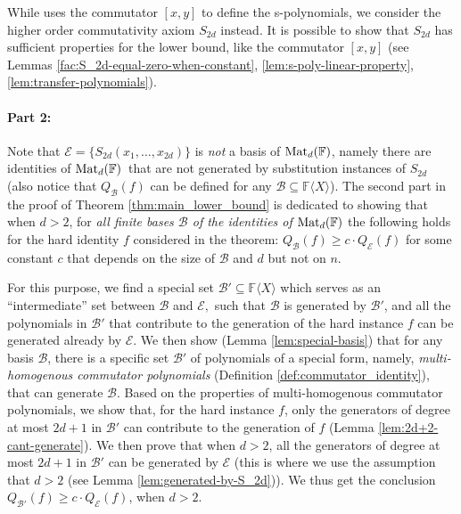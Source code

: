 \documentclass[12pt,reqno]{article}
\newcommand\F{\ensuremath{\mathbb F}}
\newcommand {\para}[1] {\paragraph{#1}}
\newcommand{\matd}{{\ensuremath{{\rm Mat}_d(\F)}}}
\newcommand{\freea}{\ensuremath{\F\langle X\rangle}}
\begin{document}
While \cite{Hru11} uses the commutator $[x,y]$ to define the s-polynomials, we consider the higher order commutativity axiom $S_{2d}$ instead. It is possible to show that  $S_{2d}$ has sufficient properties for the lower bound, like the commutator $[x,y]$ (see Lemmas \ref{fac:S_2d-equal-zero-when-constant}, \ref{lem:s-poly-linear-property}, \ref{lem:transfer-polynomials}).

\para{Part 2:} Note that $\mathcal E=\{S_{2d}(x_1,\ldots,x_{2d})\}$ is \textit{not }a basis of \matd, namely there are identities of \matd \ that are not generated by substitution instances of $S_{2d}$ (also notice that $Q_{\mathcal B}(f)$ can be  defined for any $\mathcal B\subseteq \freea$). The second part in the proof of Theorem \ref{thm:main_lower_bound} is dedicated to showing that when $d>2$, for \textit{all finite bases $\mathcal B$ of the identities of \matd} the following holds for the hard identity $f$ considered in the theorem: $Q_{\mathcal B}(f)\geq c\cdot Q_{\mathcal E}(f)$ for some constant $c$ that depends on the size of $\mathcal B$ and $d$ but not on $n$.


For this purpose, we find a special set $\mathcal B'\subseteq \freea$ which serves as an  ``intermediate'' set between $\mathcal B$ and $\mathcal E,$ such that $\mathcal B$ is generated by $\mathcal B'$, and all the polynomials in $\mathcal B'$  that contribute to the generation of the hard instance $f$ can be generated already by $\mathcal E$. We then show (Lemma \ref{lem:special-basis}) that for any basis $\mathcal B$, there is a specific set $\mathcal B'$ of polynomials of a special form, namely, \textit{multi-homogenous commutator polynomials }(Definition \ref{def:commutator_identity}), that can generate $\mathcal B$. Based on the properties of multi-homogenous commutator polynomials, we show that, for the hard instance $f$, only the generators of degree at most $2d+1$ in $\mathcal B'$  can contribute to the generation of $f$ (Lemma \ref{lem:2d+2-cant-generate}). We then prove that  when $d>2$, all the generators of degree at most $2d+1$ in $\mathcal B'$ can be generated by $\mathcal E$ (this is where we use the assumption that $d>2$ (see Lemma \ref{lem:generated-by-S_2d})). We thus get the conclusion $Q_{\mathcal B'}(f)\geq c \cdot Q_{\mathcal E}(f)$, when $d>2$.\bigskip
\end{document}
